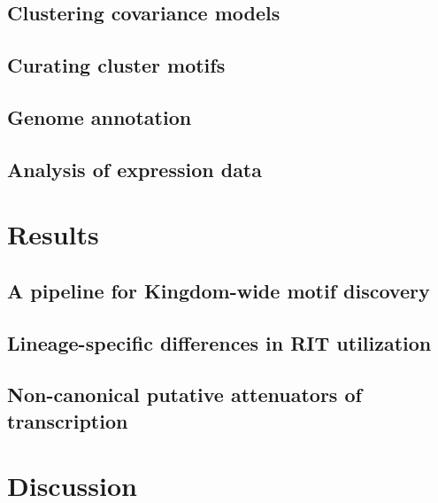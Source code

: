 \subsection{Clustering covariance models}



\subsection{Curating cluster motifs}

\subsection{Genome annotation}

\subsection{Analysis of expression data}

\section{Results}

\subsection{A pipeline for Kingdom-wide motif discovery}

\subsection{Lineage-specific differences in RIT utilization}

\subsection{Non-canonical putative attenuators of transcription}

\section{Discussion}